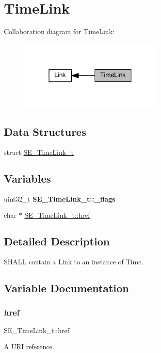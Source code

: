 \hypertarget{group__TimeLink}{}\section{Time\+Link}
\label{group__TimeLink}
Collaboration diagram for Time\+Link\+:\nopagebreak
\begin{figure}[H]
\begin{center}
\leavevmode
\includegraphics[width=207pt]{group__TimeLink}
\end{center}
\end{figure}
\subsection*{Data Structures}
\begin{DoxyCompactItemize}
\item 
struct \hyperlink{structSE__TimeLink__t}{S\+E\+\_\+\+Time\+Link\+\_\+t}
\end{DoxyCompactItemize}
\subsection*{Variables}
\begin{DoxyCompactItemize}
\item 
\mbox{\label{group__TimeLink_ga087b36a21ccf26fc4eb330ae32d127d8}} 
uint32\+\_\+t {\bfseries S\+E\+\_\+\+Time\+Link\+\_\+t\+::\+\_\+flags}
\item 
char $\ast$ \hyperlink{group__TimeLink_gaa8fa6f46d64d627ca794b3ef3e509a25}{S\+E\+\_\+\+Time\+Link\+\_\+t\+::href}
\end{DoxyCompactItemize}


\subsection{Detailed Description}
S\+H\+A\+LL contain a Link to an instance of Time. 

\subsection{Variable Documentation}
\mbox{\label{group__TimeLink_gaa8fa6f46d64d627ca794b3ef3e509a25}} 
\subsubsection{\texorpdfstring{href}{href}}
{\footnotesize\ttfamily S\+E\+\_\+\+Time\+Link\+\_\+t\+::href}

A U\+RI reference. 